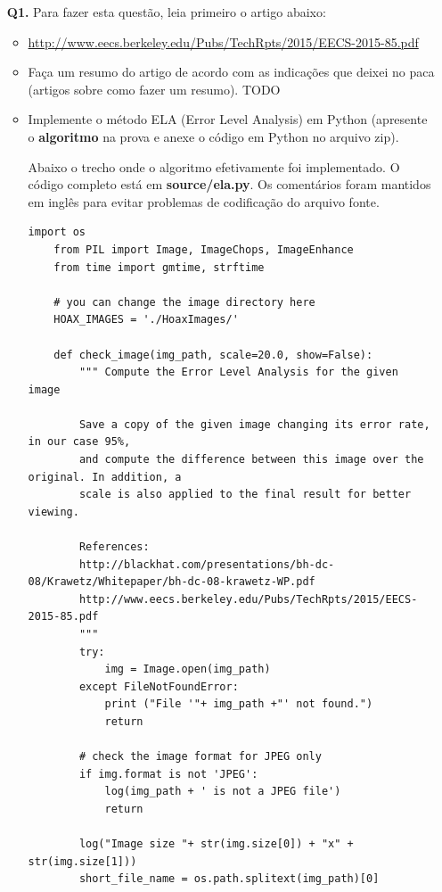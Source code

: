 \documentclass[12pt]{article}
\begin{document}
\begin{itemize}
\item[{\bf Q1.}] Para fazer esta questão, leia primeiro o artigo abaixo:
\begin{itemize}
\item \url{http://www.eecs.berkeley.edu/Pubs/TechRpts/2015/EECS-2015-85.pdf}
\end{itemize} 
\begin{itemize}
\item Faça um resumo do artigo de acordo com as indicações que deixei no paca (artigos sobre como fazer um resumo).
TODO

\item Implemente o método ELA (Error Level Analysis) em Python (apresente o 
\textbf{algoritmo} na prova e anexe o código em Python no arquivo zip).

Abaixo o trecho onde o algoritmo efetivamente foi implementado. O código completo está em \textbf{source/ela.py}. Os comentários
foram mantidos em inglês para evitar problemas de codificação do arquivo fonte.
    
    \begin{lstlisting}[basicstyle=\ttfamily]
    import os
    from PIL import Image, ImageChops, ImageEnhance
    from time import gmtime, strftime
    
    # you can change the image directory here
    HOAX_IMAGES = './HoaxImages/'
    
    def check_image(img_path, scale=20.0, show=False):
        """ Compute the Error Level Analysis for the given image
        
        Save a copy of the given image changing its error rate, in our case 95%,
        and compute the difference between this image over the original. In addition, a
        scale is also applied to the final result for better viewing.
        
        References: 
        http://blackhat.com/presentations/bh-dc-08/Krawetz/Whitepaper/bh-dc-08-krawetz-WP.pdf
        http://www.eecs.berkeley.edu/Pubs/TechRpts/2015/EECS-2015-85.pdf
        """
        try:
            img = Image.open(img_path)
        except FileNotFoundError:
            print ("File '"+ img_path +"' not found.")
            return
        
        # check the image format for JPEG only
        if img.format is not 'JPEG':
            log(img_path + ' is not a JPEG file')
            return
    
        log("Image size "+ str(img.size[0]) + "x" + str(img.size[1]))
        short_file_name = os.path.splitext(img_path)[0]
        

\end{lstlisting}
\end{itemize}
\end{itemize}
\end{document}
